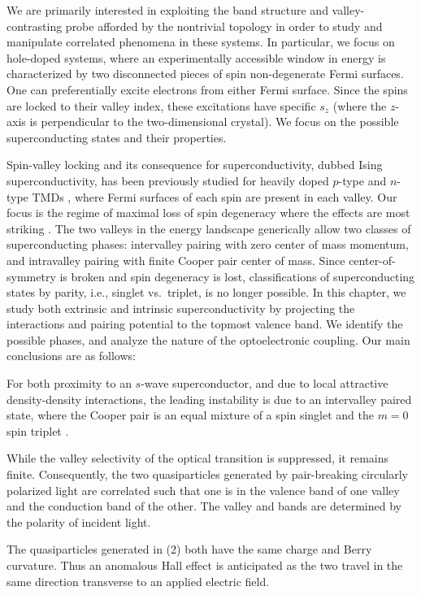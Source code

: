 We are primarily interested in exploiting
the band structure and valley-contrasting probe afforded by
the nontrivial topology in order to study and manipulate
correlated phenomena in these systems.
In particular, we focus on hole-doped systems,
where an experimentally accessible window in energy
is characterized by two disconnected pieces of
spin non-degenerate Fermi surfaces.
One can preferentially excite electrons from either Fermi surface.
Since the spins are locked to their valley index,
these excitations have specific $s_z$
(where the $z$-axis is perpendicular to the two-dimensional crystal).
We focus on the possible superconducting states and their properties.

Spin-valley locking and its consequence for superconductivity,
dubbed Ising superconductivity, has been previously studied
for heavily doped $p$-type and $n$-type TMDs
\cite{%
  Lu1353,%
  Xi2016,%
  Saito2016,%
  PhysRevB.93.180501,%
  PhysRevLett.113.097001%
},
where Fermi surfaces of each spin are present in each valley.
Our focus is the regime of maximal loss of spin degeneracy where the
effects are most striking
\cite{1604.02134v2}.
The two valleys in the energy landscape generically allow
two classes of superconducting phases:
intervalley pairing with zero center of mass momentum,
and intravalley pairing with finite Cooper pair center of mass.
Since center-of-symmetry is broken and spin degeneracy is lost,
classifications of superconducting states by parity,
i.e., singlet vs.\ triplet, is no longer possible.
In this chapter, we study both extrinsic and intrinsic superconductivity
by projecting the interactions and pairing potential to
the topmost valence band.
We identify the possible phases, and analyze the nature
of the optoelectronic coupling.
Our main conclusions are as follows:

\introparanum{}
For both proximity to an $s$-wave superconductor,
and due to local attractive density-density interactions,
the leading instability is due to an intervalley paired state,
where the Cooper pair is an equal mixture
of a spin singlet and the $m = 0$ spin triplet
\cite{PhysRevLett.87.037004}.

\introparanum{}
While the valley selectivity of the optical transition is suppressed,
it remains finite.
Consequently, the two quasiparticles
generated by pair-breaking circularly polarized light
are correlated such that one is in the valence band of one valley
and the conduction band of the other.
The valley and bands are determined by the polarity of incident light.

\introparanum{}
The quasiparticles generated in (2)
both have the same charge and Berry curvature.
Thus an anomalous Hall effect is anticipated
as the two travel in the same direction transverse to an applied electric field.
